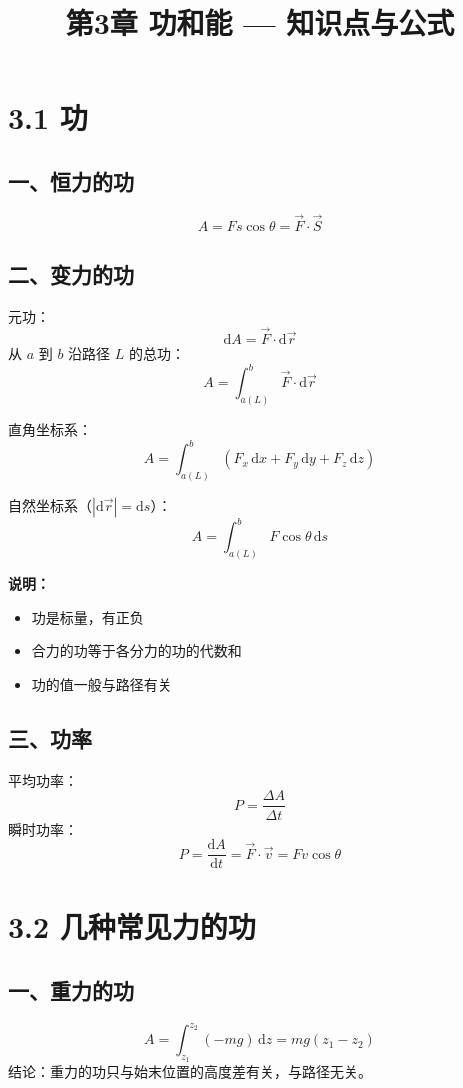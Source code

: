 \documentclass{ctexart}
\title{\textbf{第3章 功和能} --- 知识点与公式}
\author{}
\date{}
\begin{document}
\maketitle

\section*{3.1 功}

\subsection*{一、恒力的功}
\[
A = Fs\cos\theta = \vec{F}\cdot\vec{S}
\]

\subsection*{二、变力的功}
元功：
\[
\mathrm{d}A = \vec{F}\cdot\mathrm{d}\vec{r}
\]
从 $a$ 到 $b$ 沿路径 $L$ 的总功：
\[
A = \int_{a(L)}^{b} \vec{F}\cdot\mathrm{d}\vec{r}
\]

直角坐标系：
\[
A = \int_{a(L)}^{b} (F_x\,\mathrm{d}x + F_y\,\mathrm{d}y + F_z\,\mathrm{d}z)
\]

自然坐标系（$|\mathrm{d}\vec{r}| = \mathrm{d}s$）：
\[
A = \int_{a(L)}^{b} F\cos\theta\,\mathrm{d}s
\]

\textbf{说明：}
\begin{itemize}
  \item 功是标量，有正负
  \item 合力的功等于各分力的功的代数和
  \item 功的值一般与路径有关
\end{itemize}

\subsection*{三、功率}
平均功率：
\[
P = \frac{\Delta A}{\Delta t}
\]
瞬时功率：
\[
P = \frac{\mathrm{d}A}{\mathrm{d}t} = \vec{F}\cdot\vec{v} = Fv\cos\theta
\]

\section*{3.2 几种常见力的功}

\subsection*{一、重力的功}
\[
A = \int_{z_1}^{z_2} (-mg)\,\mathrm{d}z = mg(z_1 - z_2)
\]
结论：重力的功只与始末位置的高度差有关，与路径无关。
\end{document}
